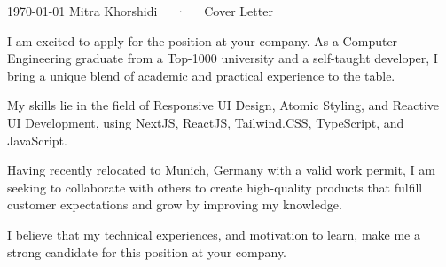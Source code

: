 
\makecvheader[L]

\makecvfooter
  {\today}
  {Mitra Khorshidi~~~·~~~Cover Letter}
  {}

\makelettertitle

\begin{cvletter}

  I am excited to apply for the \textbf{\jobposition} position at your company. As a Computer Engineering 
  graduate from a Top-1000 university and a self-taught developer, 
  I bring a unique blend of academic and practical experience to the table.
  
  My skills lie in the field of Responsive UI Design, Atomic Styling, and Reactive UI Development, 
  using NextJS, ReactJS, Tailwind.CSS, TypeScript, and JavaScript.
  
  Having recently relocated to Munich, Germany with a valid work permit, 
  I am seeking to collaborate with others to create high-quality products 
  that fulfill customer expectations and grow by improving my knowledge.
  
  I believe that my technical experiences, and motivation to learn, make me a strong candidate 
  for this position at your company.
  

\end{cvletter}
